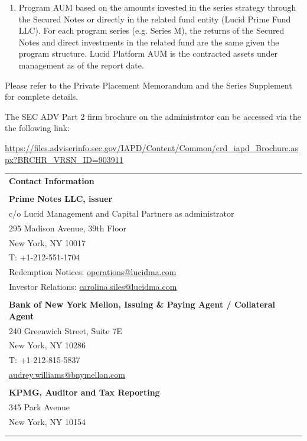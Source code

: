 \documentclass[9pt]{article}
\begin{document}
\begin{enumerate}
\item Program AUM based on the amounts invested in the series strategy through the Secured Notes or directly in the related fund entity (Lucid Prime Fund LLC).  For each program series (e.g. Series M), the returns of the Secured Notes and direct investments in the related fund are the same given the program structure. Lucid Platform AUM is the contracted assets under management as of the report date.

\end{enumerate}

\noindent Please refer to the Private Placement Memorandum and the Series Supplement for complete details. 

{\color{gray} \noindent The SEC ADV Part 2 firm brochure on the administrator can be accessed via the the following link:

\noindent\underline{https://files.adviserinfo.sec.gov/IAPD/Content/Common/crd\_iapd\_Brochure.aspx?BRCHR\_VRSN\_ID=903911}}

\begin{center}\noindent\begin{tabular}{p{\textwidth}}
\rowcolor{lucid_blue} 
{\color[HTML]{FFFFFF} \textbf{Contact Information}} \\
\rowcolor[HTML]{EFEFEF} 
 \\
\rowcolor[HTML]{EFEFEF} 
\textbf{Prime Notes LLC, issuer} \\
\rowcolor[HTML]{EFEFEF} 
 c/o Lucid Management and Capital Partners as administrator\\
\rowcolor[HTML]{EFEFEF} 
 295 Madison Avenue, 39th Floor\\
\rowcolor[HTML]{EFEFEF} 
 New York, NY 10017\\
\rowcolor[HTML]{EFEFEF} 
 T: +1-212-551-1704\\
\rowcolor[HTML]{EFEFEF} 
 Redemption Notices: \underline{operations@lucidma.com}\\
\rowcolor[HTML]{EFEFEF} 
 Investor Relations: \underline{carolina.siles@lucidma.com}\\
\rowcolor[HTML]{EFEFEF} 
 \\
\rowcolor[HTML]{EFEFEF} 
\textbf{Bank of New York Mellon, Issuing \& Paying Agent / Collateral Agent} \\
\rowcolor[HTML]{EFEFEF} 
 240 Greenwich Street, Suite 7E\\
\rowcolor[HTML]{EFEFEF} 
 New York, NY 10286\\
\rowcolor[HTML]{EFEFEF} 
 T: +1-212-815-5837\\
\rowcolor[HTML]{EFEFEF} 
 \underline{audrey.williams@bnymellon.com}\\
\rowcolor[HTML]{EFEFEF} 
 \\
\rowcolor[HTML]{EFEFEF} 
 \textbf{KPMG, Auditor and Tax Reporting}\\
\rowcolor[HTML]{EFEFEF} 
 345 Park Avenue\\
\rowcolor[HTML]{EFEFEF} 
 New York, NY 10154\\
\rowcolor[HTML]{EFEFEF} 
 \\
\rowcolor[HTML]{EFEFEF} 

\end{tabular}
\end{center}
\end{document}
